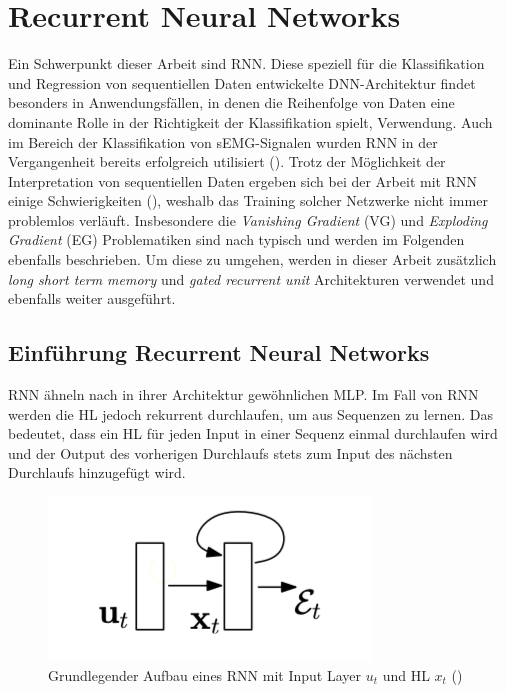\chapter{Recurrent Neural Networks}
\label{chap:rnn}
Ein Schwerpunkt dieser Arbeit sind RNN. Diese speziell für die Klassifikation und Regression von sequentiellen Daten entwickelte DNN-Architektur findet besonders in Anwendungsfällen, in denen die Reihenfolge von Daten eine dominante Rolle in der Richtigkeit der Klassifikation spielt, Verwendung. Auch im Bereich der Klassifikation von sEMG-Signalen wurden RNN in der Vergangenheit bereits erfolgreich utilisiert (\cite{simao2019emg}). Trotz der Möglichkeit der Interpretation von sequentiellen Daten ergeben sich bei der Arbeit mit RNN einige Schwierigkeiten (\cite{pascanu2013difficulty}), weshalb das Training solcher Netzwerke nicht immer problemlos verläuft. Insbesondere die \textit{Vanishing Gradient} (VG) und \textit{Exploding Gradient} (EG) Problematiken sind nach \cite{pascanu2013difficulty} typisch und werden im Folgenden ebenfalls beschrieben. Um diese zu umgehen, werden in dieser Arbeit zusätzlich \textit{long short term memory} und \textit{gated recurrent unit} Architekturen verwendet und ebenfalls weiter ausgeführt.

\section{Einführung Recurrent Neural Networks}
\label{sec:rnn}
RNN ähneln nach \cite{pascanu2013difficulty} in ihrer Architektur gewöhnlichen MLP. Im Fall von RNN werden die HL jedoch rekurrent durchlaufen, um aus Sequenzen zu lernen. Das bedeutet, dass ein HL für jeden Input in einer Sequenz einmal durchlaufen wird und der Output des vorherigen Durchlaufs stets zum Input des nächsten Durchlaufs hinzugefügt wird. 

\begin{figure}[h]
    \begin{center}
        \includegraphics[scale=0.8]{grafiken/rnn-basic.png}
        \caption{Grundlegender Aufbau eines RNN mit Input Layer $u_t$ und HL $x_t$ (\cite{pascanu2013difficulty})}
        \label{rnn-basic}
    \end{center}
\end{figure}

